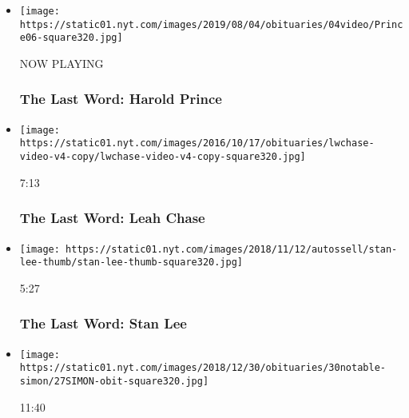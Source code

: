 \begin{itemize}
\item
  \texttt{[image: https://static01.nyt.com/images/2019/08/04/obituaries/04video/Prince06-square320.jpg]}

  NOW PLAYING

  \hypertarget{the-last-word-harold-prince-2}{%
  \subsubsection{The Last Word: Harold
  Prince}\label{the-last-word-harold-prince-2}}
\item
  \href{https://www.nytimes.com/video/obituaries/100000001635129/leah-chase-obituary.html?action=click\&module=video-series-bar\&region=header\&pgtype=Article\&playlistId=video/last-word}{}

  \texttt{[image: https://static01.nyt.com/images/2016/10/17/obituaries/lwchase-video-v4-copy/lwchase-video-v4-copy-square320.jpg]}

  7:13

  \hypertarget{the-last-word-leah-chase}{%
  \subsubsection{The Last Word: Leah
  Chase}\label{the-last-word-leah-chase}}
\item
  \href{https://www.nytimes.com/video/obituaries/100000006211149/stan-lee-marvel-dies.html?action=click\&module=video-series-bar\&region=header\&pgtype=Article\&playlistId=video/last-word}{}

  \texttt{[image: https://static01.nyt.com/images/2018/11/12/autossell/stan-lee-thumb/stan-lee-thumb-square320.jpg]}

  5:27

  \hypertarget{the-last-word-stan-lee}{%
  \subsubsection{The Last Word: Stan Lee}\label{the-last-word-stan-lee}}
\item
  \href{https://www.nytimes.com/video/obituaries/1194826919055/neil-simon-last-word-obituary.html?action=click\&module=video-series-bar\&region=header\&pgtype=Article\&playlistId=video/last-word}{}

  \texttt{[image: https://static01.nyt.com/images/2018/12/30/obituaries/30notable-simon/27SIMON-obit-square320.jpg]}

  11:40


\end{itemize}
